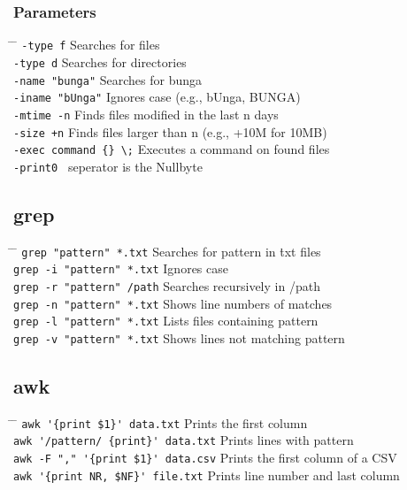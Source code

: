 \documentclass[a4paper,10pt]{article}
\begin{document}
\subsubsection*{Parameters}
\begin{tabbing}
	\= \hspace{60mm} \= \hspace{80mm} \kill
	\> \verb|-type f| \> Searches for files \\
	\> \verb|-type d| \> Searches for directories \\
	\> \verb|-name "bunga"| \> Searches for bunga \\
	\> \verb|-iname "bUnga"| \> Ignores case (e.g., bUnga, BUNGA) \\
	\> \verb|-mtime -n| \> Finds files modified in the last n days \\
	\> \verb|-size +n| \> Finds files larger than n (e.g., +10M for 10MB) \\
	\> \verb|-exec command {} \;| \> Executes a command on found files \\
	\> \verb|-print0 | \> seperator is the Nullbyte \\
\end{tabbing}

\subsection{grep}
\begin{tabbing}
	\= \hspace{60mm} \= \hspace{80mm} \kill
	\> \verb|grep "pattern" *.txt| \> Searches for pattern in \.txt files \\
	\> \verb|grep -i "pattern" *.txt| \> Ignores case \\
	\> \verb|grep -r "pattern" /path| \> Searches recursively in /path \\
	\> \verb|grep -n "pattern" *.txt| \> Shows line numbers of matches \\
	\> \verb|grep -l "pattern" *.txt| \> Lists files containing pattern \\
	\> \verb|grep -v "pattern" *.txt| \> Shows lines not matching pattern \\
\end{tabbing}

\subsection{awk}
\begin{tabbing}
	\= \hspace{60mm} \= \hspace{80mm} \kill
	\> \verb|awk '{print $1}' data.txt| \> Prints the first column \\
	\> \verb|awk '/pattern/ {print}' data.txt| \> Prints lines with pattern \\
	\> \verb|awk -F "," '{print $1}' data.csv| \> Prints the first column of a CSV \\
	\> \verb|awk '{print NR, $NF}' file.txt| \> Prints line number and last column \\
\end{tabbing}
\end{document}
